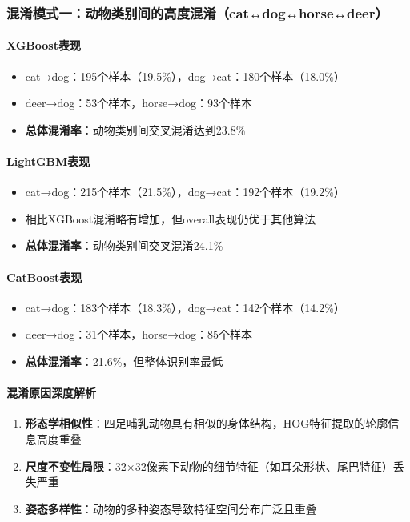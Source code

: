 \documentclass[UTF8]{report}
\theoremstyle{MyLineTheoremStyle} %
\theoremstyle{MyBlockTheoremStyle} %
\theoremstyle{MySubsubsectionStyle} %
\begin{document}
\subsubsection{混淆模式一：动物类别间的高度混淆（cat↔dog↔horse↔deer）}
\paragraph{XGBoost表现}
\begin{itemize}
    \item cat→dog：195个样本（19.5\%），dog→cat：180个样本（18.0\%）
    \item deer→dog：53个样本，horse→dog：93个样本
    \item \textbf{总体混淆率}：动物类别间交叉混淆达到23.8\%
\end{itemize}
\paragraph{LightGBM表现}
\begin{itemize}
    \item cat→dog：215个样本（21.5\%），dog→cat：192个样本（19.2\%）
    \item 相比XGBoost混淆略有增加，但overall表现仍优于其他算法
    \item \textbf{总体混淆率}：动物类别间交叉混淆24.1\%
\end{itemize}
\paragraph{CatBoost表现}
\begin{itemize}
    \item cat→dog：183个样本（18.3\%），dog→cat：142个样本（14.2\%）
    \item deer→dog：31个样本，horse→dog：85个样本
    \item \textbf{总体混淆率}：21.6\%，但整体识别率最低
\end{itemize}
\paragraph{混淆原因深度解析}
\begin{enumerate}
    \item \textbf{形态学相似性}：四足哺乳动物具有相似的身体结构，HOG特征提取的轮廓信息高度重叠
    \item \textbf{尺度不变性局限}：32×32像素下动物的细节特征（如耳朵形状、尾巴特征）丢失严重
    \item \textbf{姿态多样性}：动物的多种姿态导致特征空间分布广泛且重叠
\end{enumerate}
\end{document}
